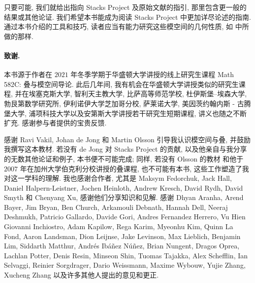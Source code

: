 只要可能, 我们就给出指向 Stacks Project 及原始文献的指引, 那里包含更一般的结果或其他论证. 我们希望本书能成为阅读 Stacks Project 中更加详尽论述的指南. 通过本书介绍的工具和技巧, 读者应当有能力研究这些模空间的几何性质, 如 \cite{HM98,HL10} 中所做的那样.

\paragraph*{致谢.} 本书源于作者在 $2021$ 年冬季学期于华盛顿大学讲授的线上研究生课程 Math 582C: 叠与模空间导论. 此后几年间, 我有机会在华盛顿大学讲授类似的研究生课程, 并在埃塞克斯大学, 智利天主教大学, 比萨高等师范学校, 杜伊斯堡--埃森大学, 勃艮第数学研究所, 伊利诺伊大学芝加哥分校, 萨莱诺大学, 美因茨约翰内斯 - 古腾堡大学, 浦项科技大学以及安第斯大学讲授若干研究生短期课程, 讲义也随之不断扩充. 感谢参与者提供的宝贵反馈.

感谢 Ravi Vakil, Johan de Jong 和 Martin Olsson 引导我认识模空间与叠, 并鼓励我撰写这本教材. 若没有 de Jong 对 Stacks Project 的贡献, 以及他亲自与我分享的无数其他论证和例子, 本书便不可能完成; 同样, 若没有 Olsson 的教材 \cite{Ols16} 和他于 $2007$ 年在加州大学伯克利分校讲授的叠课程, 也不可能有本书, 这些工作塑造了我对这一学科的理解. 我也感谢合作者, 尤其是 Maksym Fedorchuk, Jack Hall, Daniel Halpern-Leistner, Jochen Heinloth, Andrew Kresch, David Rydh, David Smyth 和 Chenyang Xu, 感谢他们分享知识和见解. 感谢 Dhyan Aranha, Arend Bayer, Jim Bryan, Ben Church, Arkamouli Debnath, Hannah Dell, Neeraj Deshmukh, Patricio Gallardo, Davide Gori, Andres Fernandez Herrero, Vu Hien Giovanni Inchiostro, Adam Kapilow, Rega Karim, Myeonhu Kim, Quinn La Fond, Aaron Landsman, Dion Leijnse, Jake Levinson, Max Lieblich, Benjamin Lim, Siddarth Matthur, Andrés Ibáñez Núñez, Brian Nungent, Dragos Oprea, Lachlan Potter, Denis Resin, Minseon Shin, Tuomas Tajakka, Alex Schefflin, Ian Selvaggi, Reinier Sorgdrager, Dario Weissmann, Maxime Wybouw, Yujie Zhang, Xucheng Zhang 以及许多其他人提出的意见和更正.
